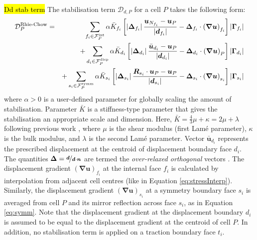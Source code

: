 \documentclass[sn-mathphys,Numbered]{sn-jnl}%
\newcommand{\bb}{\boldsymbol}
\begin{document}
\hl{Dd stab term}
The stabilisation term  $\mathcal{D}_{d,P}$ for a cell $P$ takes the following form:
\begin{eqnarray} \label{eq:RhieChow}
	\mathcal{D}_P^{\text {Rhie-Chow}}
	&=& \sum_{f_i \in \mathcal{F}^{\text{int}}_P} \alpha \bar{K}_{f_i} \left[
		\left|\bb{\Delta}_{f_i} \right| \frac{ \bb{u}_{N_{f_i}} - \bb{u}_P}{\left|\bb{d}_{f_i}\right|}	- \bb{\Delta}_{f_i} \cdot \left(\bb{\nabla} \bb{u} \right)_{f_i}
		\right]    \left|\bb{\Gamma}_{f_i}\right| \notag \\
	&&+ \sum_{d_i \in \mathcal{F}^{\text{disp}}_P} \alpha \bar{K}_{d_i} \left[
		\left|\bb{\Delta}_{d_i} \right| \frac{ \bar{\bb{u}}_{d_i} - \bb{u}_P}{\left|\bb{d}_{d_i}\right|}	- \bb{\Delta}_{d_i} \cdot \left(\bb{\nabla} \bb{u} \right)_{P}
		\right]    \left|\bb{\Gamma}_{d_i}\right| \notag \\
	&&+ \sum_{s_i \in \mathcal{F}^{\text{symm}}_P} \alpha \bar{K}_{s_i} \left[
		\left|\bb{\Delta}_{s_i} \right| \frac{ \bb{R}_{s_i} \cdot \bb{u}_{P} - \bb{u}_P}{\left|\bb{d}_{s_i}\right|} - \bb{\Delta}_{s_i} \cdot \left(\bb{\nabla} \bb{u} \right)_{s_i}
		\right]    \left|\bb{\Gamma}_{s_i}\right|
\end{eqnarray}
where $\alpha > 0$ is a user-defined parameter for globally scaling the amount of stabilisation.
Parameter $\bar{K}$ is a stiffness-type parameter that gives the stabilisation an appropriate scale and dimension.
Here, $\bar{K} = \frac{4}{3}\mu + \kappa = 2\mu + \lambda$ following previous work \cite{Jasak2000, Cardiff2017, Cardiff2018}, where $\mu$ is the shear modulus (first Lam\'{e} parameter), $\kappa$ is the bulk modulus, and $\lambda$ is the second Lam\'{e} parameter.
Vector $\bar{\bb{u}}_{d_i}$ represents the prescribed displacement at the centroid of displacement boundary face $d_i$.
The quantities $\bb{\Delta} = \nicefrac{\bb{d}}{\bb{d} \cdot \bb{n}}$ are termed the \emph{over-relaxed orthogonal} vectors \cite{Jasak1996}.
The displacement gradient $\left(\bb{\nabla} \bb{u} \right)_{f_i}$ at the internal face $f_i$ is calculated by interpolation from adjacent cell centres (like in Equation \ref{eq:stressInterp}).
Similarly, the displacement gradient $\left(\bb{\nabla} \bb{u} \right)_{s_i}$ at a symmetry boundary face $s_i$ is averaged from cell $P$ and its mirror reflection across face $s_i$, as in Equation \ref{eq:symm}.
Note that the displacement gradient at the displacement boundary $d_i$ is assumed to be equal to the displacement gradient at the centroid of cell $P$.
In addition, no stabilisation term is applied on a traction boundary face $t_i$.
\end{document}
